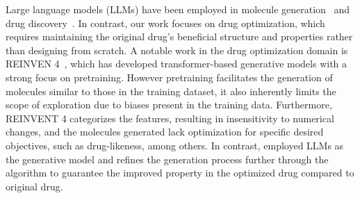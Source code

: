 Large language models (LLMs) have been employed in molecule generation~\citep{bagal2021molgpt, rothchild2021c5t5, frey2023neural} and drug discovery~\citep{bran2023transformers, liu2024erp}. In contrast, our work focuses on drug optimization, which requires maintaining the original drug's beneficial structure and properties rather than designing from scratch.
A notable work in the drug optimization domain is REINVEN 4~\citep{he2021molecular, he2022transformer, loeffler2024reinvent}, which has developed transformer-based generative models with a strong focus on pretraining. However pretraining facilitates the generation of molecules similar to those in the training dataset, it also inherently limits the scope of exploration due to biases present in the training data. {Furthermore, REINVENT 4 categorizes the features, resulting in insensitivity to numerical changes, and the molecules generated lack optimization for specific desired objectives, such as drug-likeness, among others.}
In contrast, {\fwname} employed LLMs as the generative model and refines the generation process further through the \algname algorithm to guarantee the improved property in the optimized drug compared to original drug.